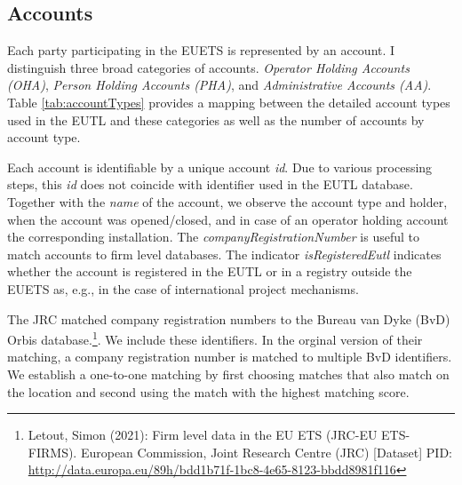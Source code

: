 \documentclass[authoryear]{elsarticle}
\begin{document}
\subsection{Accounts}
Each party participating in the EUETS is represented by an account. I distinguish three broad categories of accounts. \emph{Operator Holding Accounts (OHA)}, \emph{Person Holding Accounts (PHA)}, and \emph{Administrative Accounts (AA)}. Table \ref{tab:accountTypes} provides a mapping between the detailed account types used in the EUTL and these categories as well as the number of accounts by account type.

Each account is identifiable by a unique account \textit{id}. Due to various processing steps, this \textit{id} does not coincide with identifier used in the EUTL database. Together with the \textit{name} of the account, we observe the account type and holder, when the account was opened/closed, and in case of an operator holding account the corresponding installation. The \textit{companyRegistrationNumber} is useful to match accounts to firm level databases. The indicator \textit{isRegisteredEutl} indicates whether the account is registered in the EUTL or in a registry outside the EUETS as, e.g., in the case of international project mechanisms. 

The JRC matched company registration numbers to the Bureau van Dyke (BvD) Orbis database.\footnote{Letout, Simon (2021): Firm level data in the EU ETS (JRC-EU ETS-FIRMS). European Commission, Joint Research Centre (JRC) [Dataset] PID: \url{http://data.europa.eu/89h/bdd1b71f-1bc8-4e65-8123-bbdd8981f116}}. We include these identifiers. In the orginal version of their matching, a company registration number is matched to multiple BvD identifiers. We establish a one-to-one matching by first choosing matches that also match on the location and second using the match with the highest matching score. 
\end{document}
